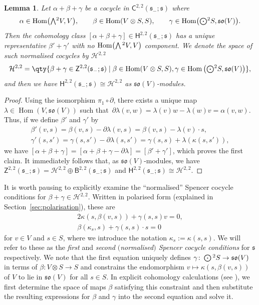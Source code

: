 \documentclass[pdftex]{sigma}
\numberwithin{equation}{section}
\newtheorem{Lemma}[Theorem]{Lemma}
\newcommand{\fs}{\mathfrak{s}}
\newcommand{\fso}{\mathfrak{so}}
\newcommand{\cH}{\mathcal{H}}
\newcommand{\ssB}{\mathsf{B}}
\newcommand{\ssC}{\mathsf{C}}
\newcommand{\ssH}{\mathsf{H}}
\newcommand{\ssZ}{\mathsf{Z}}
\newcommand{\Wedge}{\mathchoice{{\textstyle\bigwedge}}{\bigwedge}{\bigwedge}{\bigwedge}}	%
\newcommand{\Odot}{\mathchoice{{\textstyle\bigodot}}{\bigodot}{\bigodot}{\bigodot}}
\newcommand{\1}{\mathbbm{1}}
\DeclareMathOperator{\Hom}{Hom}
\begin{document}
\begin{Lemma} \label{lemma:H22-full-flat-model}
	Let $\alpha+\beta+\gamma$ be a cocycle in $\ssC^{2,2}(\fs_-;\fs)$ where
	\begin{align}\label{eq:22-cocycle-comps}
		\alpha\in\Hom\bigl(\Wedge^2V,V\bigr),
		\qquad\beta\in\Hom(V\otimes S,S),
		\qquad\gamma\in\Hom\bigl(\Odot^2S,\fso(V)\bigr).
	\end{align}
	Then the cohomology class $[\alpha+\beta+\gamma]\in \ssH^{2,2}(\fs_-;\fs)$ has a unique representative $\beta'+\gamma'$ with no $\Hom\bigl(\Wedge^2 V,V\bigr)$ component. We denote the space of such \emph{normalised cocycles} by $\cH^{2,2}$
	\[
		\cH^{2,2}
		= \qty{\beta+\gamma \in \ssZ^{2,2}(\fs_-;\fs)
			 \mid
				\beta\in\Hom(V\otimes S,S), \gamma\in\Hom\big(\Odot^2S,\fso(V)\big)
			},
	\]
	and then we have
$\ssH^{2,2}(\fs_-;\fs) \cong \cH^{2,2}
$
	as $\fso(V)$-modules.
\end{Lemma}

\begin{proof}
	Using the isomorphism $\pi_1\circ\partial$, there exists a unique map $\lambda\in\Hom(V,\fso(V))$ such that~${\partial\lambda(v,w)=\lambda(v)w - \lambda(w)v = \alpha(v,w)}$.
	Thus, if we define $\beta'$ and $\gamma'$ by
	\begin{gather*}%
		\beta'(v,s) = \beta(v,s) - \partial\lambda(v,s)
			= \beta(v,s) - \lambda(v)\cdot s,\\
		\gamma'(s,s') = \gamma(s,s') - \partial\lambda(s,s')
			= \gamma(s,s) + \lambda(\kappa(s,s')),
	\end{gather*}
	we have
$[\alpha+\beta+\gamma]
		= [\alpha+\beta+\gamma-\partial\lambda]
		= [\beta' + \gamma']$,
	which proves the first claim. It immediately follows that, as $\fso(V)$-modules, we have $\ssZ^{2,2}(\fs_-;\fs)=\cH^{2,2}\oplus\ssB^{2,2}(\fs_-;\fs)$ and $\ssH^{2,2}(\fs_-;\fs) \cong \cH^{2,2}$.
\end{proof}

It is worth pausing to explicitly examine the ``normalised'' Spencer cocycle conditions for $\beta+\gamma\in\cH^{2,2}$. Written in polarised form (explained in Section~\ref{sec:polarisation}), these are
\begin{gather}
	2\kappa(s,\beta(v,s)) + \gamma(s,s)v = 0, \label{eq:cocycle-1}	\\
	\beta(\kappa_s,s) + \gamma(s,s)\cdot s = 0	\label{eq:cocycle-2}
\end{gather}
for $v\in V$ and $s\in S$, where we introduce the notation $\kappa_s:=\kappa(s,s)$. We will refer to these as the \emph{first} and \emph{second} \emph{$($normalised$)$ Spencer cocycle conditions} for $\fs$ respectively. We note that the first equation uniquely defines $\gamma\colon\Odot^2S\to\fso(V)$ in terms of $\beta\colon V\otimes S\to S$ and constrains the endomorphism $v\mapsto \kappa(s,\beta(v,s))$ of $V$ to lie in $\fso(V)$ for all $s\in S$. In explicit cohomology calculations (see \cite{Beckett2021,deMedeiros2016,deMedeiros2018,Figueroa-OFarrill2017}), we first determine the space of maps $\beta$ satisfying this constraint and then substitute the resulting expressions for $\beta$ and $\gamma$ into the second equation and solve it.
\end{document}
